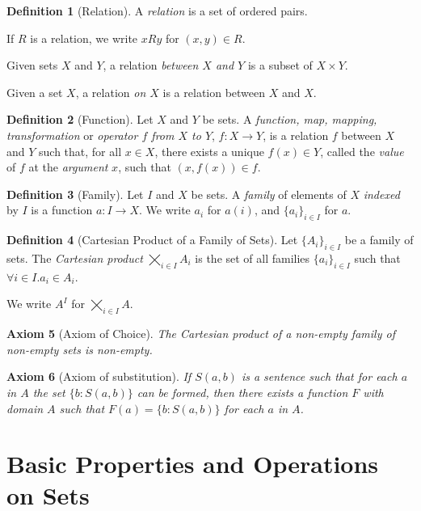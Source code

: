 \documentclass{report}
\newtheorem{ax}{Axiom}[chapter]
\theoremstyle{definition}
\newtheorem{df}[ax]{Definition}
\begin{document}
\begin{df}[Relation]
A \emph{relation} is a set of ordered pairs.

If $R$ is a relation, we write $xRy$ for $(x,y) \in R$.

Given sets $X$ and $Y$, a relation \emph{between $X$ and $Y$} is a subset of $X \times Y$.

Given a set $X$, a relation \emph{on $X$} is a relation between $X$ and $X$.
\end{df}

\begin{df}[Function]
Let $X$ and $Y$ be sets. A \emph{function, map, mapping, transformation} or \emph{operator $f$ from $X$ to $Y$}, $f : X \rightarrow Y$, is a relation $f$ between $X$ and $Y$ such that, for all $x \in X$, there exists a unique $f(x) \in Y$, called the \emph{value} of $f$ at the \emph{argument} $x$, such that $(x,f(x)) \in f$.
\end{df}

\begin{df}[Family]
Let $I$ and $X$ be sets. A \emph{family} of elements of $X$ \emph{indexed} by $I$ is a function $a : I \rightarrow X$. We write $a_i$ for $a(i)$, and $\{a_i\}_{i \in I}$ for $a$.
\end{df}

\begin{df}[Cartesian Product of a Family of Sets]
Let $\{A_i\}_{i \in I}$ be a family of sets. The \emph{Cartesian product} $\bigtimes_{i \in I} A_i$ is the set of all families $\{a_i\}_{i \in I}$ such that $\forall i \in I. a_i \in A_i$.

We write $A^I$ for $\bigtimes_{i \in I} A$.
\end{df}

\begin{ax}[Axiom of Choice]
The Cartesian product of a non-empty family of non-empty sets is non-empty.
\end{ax}

\begin{ax}[Axiom of substitution]
If $S(a,b)$ is a sentence such that for each $a$ in $A$ the set $\{ b : S(a,b) \}$ can be formed, then there exists a function $F$ with domain $A$ such that $F(a) = \{ b : S(a,b) \}$ for each $a$ in $A$.
\end{ax}

\chapter{Basic Properties and Operations on Sets}
\end{document}
